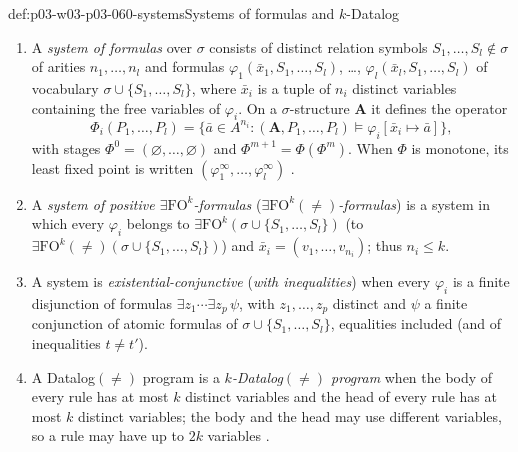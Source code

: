 \begin{hbdefinition}{def:p03-w03-p03-060-systems}{Systems of formulas and \(k\)-Datalog}
\begin{enumerate}
\item A \emph{system of formulas} over \(\sigma\) consists of distinct
      relation symbols \(S_1,\ldots,S_l\notin\sigma\) of arities
      \(n_1,\ldots,n_l\) and formulas
      \(\varphi_1(\bar x_1,S_1,\ldots,S_l)\), \dots,
      \(\varphi_l(\bar x_l,S_1,\ldots,S_l)\) of vocabulary \(\sigma\cup\{S_1,\ldots,S_l\}\), where \(\bar x_i\) is
      a tuple of \(n_i\) distinct variables containing the free variables of
      \(\varphi_i\). On a \(\sigma\)-structure \(\mathbf A\) it defines the
      operator
      \[
       \Phi_i(P_1,\ldots,P_l)=\{\bar a\in A^{n_i}:(\mathbf A,P_1,\ldots,P_l)\models\varphi_i[\bar x_i\mapsto\bar a]\},
      \]
      with stages \(\Phi^0=(\varnothing,\ldots,\varnothing)\) and
      \(\Phi^{m+1}=\Phi(\Phi^m)\). When \(\Phi\) is monotone, its least
      fixed point is written \((\varphi_1^\infty,\ldots,\varphi_l^\infty)\)
      \cite[Defs.~6.12 and~6.15, pp.~39--40]{Kolaitis2003ExpressivePowerNotes}.
\item A \emph{system of positive \(\exists\mathrm{FO}^k\)-formulas}
      (\emph{\(\exists\mathrm{FO}^k(\neq)\)-formulas}) is a system in which
      every \(\varphi_i\) belongs to
      \(\exists\mathrm{FO}^k(\sigma\cup\{S_1,\ldots,S_l\})\)
      (to \(\exists\mathrm{FO}^k(\neq)(\sigma\cup\{S_1,\ldots,S_l\})\)) and
      \(\bar x_i=(v_1,\ldots,v_{n_i})\); thus \(n_i\le k\).
\item A system is \emph{existential-conjunctive} (\emph{with
      inequalities}) when every \(\varphi_i\) is a finite disjunction of
      formulas \(\exists z_1\cdots\exists z_p\,\psi\), with
      \(z_1,\ldots,z_p\) distinct and \(\psi\) a finite conjunction of
      atomic formulas of \(\sigma\cup\{S_1,\ldots,S_l\}\), equalities
      included (and of inequalities \(t\neq t'\)).
\item A Datalog\((\neq)\) program is a \emph{\(k\)-Datalog\((\neq)\)
      program} when the body of every rule has at most \(k\) distinct
      variables and the head of every rule has at most \(k\) distinct
      variables; the body and the head may use different variables, so a
      rule may have up to \(2k\) variables \cite[p.~70]{Kolaitis2003ExpressivePowerNotes}.
\end{enumerate}
\end{hbdefinition}

